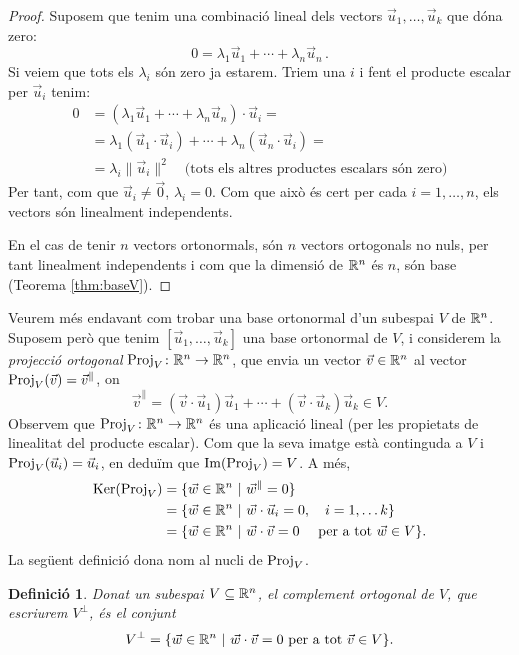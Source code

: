\documentclass[
  11pt,
]{book}
\numberwithin{dummy}{section}
\theoremstyle{maincolornumbox}
\theoremstyle{blacknumex}
\theoremstyle{blacknumbox}
\newtheorem{definitionT}{Definició}[chapter]
\theoremstyle{maincolornum}
\newenvironment{definition}{\begin{dBox}\begin{definitionT}}{\end{definitionT}\end{dBox}}
\newlength\esp
\begin{document}
\begin{proof}
Suposem que tenim una combinació lineal dels vectors
\(\vec u_1, \dots, \vec u_k\) que dóna zero:
\[0 = \lambda_1 \vec u_1 + \cdots + \lambda_n\vec u_n \,.\] Si veiem que
tots els \(\lambda_i\) són zero ja estarem. Triem una \(i\) i fent el
producte escalar per \(\vec u_i\) tenim: \begin{align*}
    0 &  = (\lambda_1 \vec u_1 + \cdots + \lambda_n\vec u_n)\cdot \vec u_i= \\
     & = \lambda_1 (\vec u_1 \cdot \vec u_i) + \cdots + \lambda_n(\vec u_n\cdot \vec u_i)=\\
     & = \lambda_i \|\vec u_i\|^2\quad \text{(tots els altres productes escalars són zero)}
\end{align*} Per tant, com que \(\vec u_i\neq\vec 0\), \(\lambda_i=0\).
Com que això és cert per cada \(i=1,\ldots,n\), els vectors són linealment
independents.

En el cas de tenir \(n\) vectors ortonormals, són \(n\) vectors ortogonals
no nuls, per tant linealment independents i com que la dimensió de
\(\mathbb{R}^n\) és \(n\), són base
(Teorema \ref{thm:baseV}).
\end{proof}

Veurem més endavant com trobar una base ortonormal d'un subespai \(V\) de
\(\mathbb{R}^n\). Suposem però que tenim \([\vec u_1,\ldots,\vec u_k]\) una base
ortonormal de \(V\), i considerem la \emph{projecció ortogonal}
\(\operatorname{Proj}_V\colon \mathbb{R}^n\rightarrow \mathbb{R}^n\), que envia un vector
\(\vec v\in \mathbb{R}^n\) al vector \(\operatorname{Proj}_V(\vec v) = \vec v^\parallel\), on
\[\vec v^\parallel = (\vec v\cdot \vec u_1)\vec u_1 + \cdots + (\vec v\cdot \vec u_k)\vec u_k \in V.\]
Observem que \(\operatorname{Proj}_V\colon \mathbb{R}^n\rightarrow \mathbb{R}^n\) és una aplicació
lineal (per les propietats de linealitat del producte escalar). Com que
la seva imatge està continguda a \(V\) i \(\operatorname{Proj}_V(\vec u_i) = \vec u_i\),
en deduïm que \(\operatorname{Im}(\operatorname{Proj}_V)=V\). A més, \begin{align*}
\operatorname{Ker}(\operatorname{Proj}_V) &= \{\vec w\in\mathbb{R}^n ~|~ \vec w^\parallel = 0\}\\
              &= \{\vec w\in\mathbb{R}^n ~|~ \vec w\cdot \vec u_i = 0, \quad i=1,\ldots k\}\\
              &= \{\vec w\in\mathbb{R}^n ~|~ \vec w\cdot \vec v = 0\quad\text{ per a tot }\vec w \in V\}.
\end{align*} La següent definició dona nom al nucli de \(\operatorname{Proj}_V\).

\begin{definition}
Donat un subespai \(V\subseteq \mathbb{R}^n\), el \emph{complement ortogonal} de \(V\),
que escriurem \(V^\perp\), és el conjunt
\[V^\perp = \{\vec w\in \mathbb{R}^n ~|~ \vec w\cdot \vec v = 0\text{ per a tot } \vec v\in V\}.\]
\end{definition}
\end{document}
